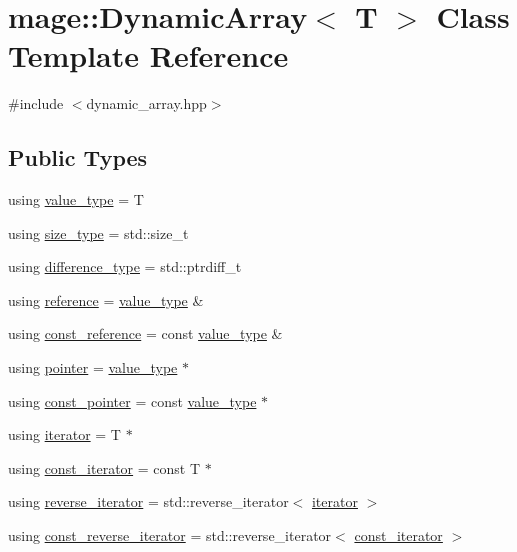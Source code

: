 \hypertarget{classmage_1_1_dynamic_array}{}\section{mage\+:\+:Dynamic\+Array$<$ T $>$ Class Template Reference}
\label{classmage_1_1_dynamic_array}


{\ttfamily \#include $<$dynamic\+\_\+array.\+hpp$>$}

\subsection*{Public Types}
\begin{DoxyCompactItemize}
\item 
using \mbox{\hyperlink{classmage_1_1_dynamic_array_a1f26711f844168c39991df0d5a340178}{value\+\_\+type}} = T
\item 
using \mbox{\hyperlink{classmage_1_1_dynamic_array_abae3236bcd8d1de414cbdf05219966b9}{size\+\_\+type}} = std\+::size\+\_\+t
\item 
using \mbox{\hyperlink{classmage_1_1_dynamic_array_a23347e93a3cf12c24608d95ed698ce20}{difference\+\_\+type}} = std\+::ptrdiff\+\_\+t
\item 
using \mbox{\hyperlink{classmage_1_1_dynamic_array_ac725ab843a578b8eb2e4499eca728149}{reference}} = \mbox{\hyperlink{classmage_1_1_dynamic_array_a1f26711f844168c39991df0d5a340178}{value\+\_\+type}} \&
\item 
using \mbox{\hyperlink{classmage_1_1_dynamic_array_ad2c044077223c0463e317649d4513dbc}{const\+\_\+reference}} = const \mbox{\hyperlink{classmage_1_1_dynamic_array_a1f26711f844168c39991df0d5a340178}{value\+\_\+type}} \&
\item 
using \mbox{\hyperlink{classmage_1_1_dynamic_array_a32797baab97829f4040b95383cdebf51}{pointer}} = \mbox{\hyperlink{classmage_1_1_dynamic_array_a1f26711f844168c39991df0d5a340178}{value\+\_\+type}} $\ast$
\item 
using \mbox{\hyperlink{classmage_1_1_dynamic_array_a875dce615abb0b5c6989167b3db40ef4}{const\+\_\+pointer}} = const \mbox{\hyperlink{classmage_1_1_dynamic_array_a1f26711f844168c39991df0d5a340178}{value\+\_\+type}} $\ast$
\item 
using \mbox{\hyperlink{classmage_1_1_dynamic_array_af49b03e8ab90f3f38f6fc735cef81baf}{iterator}} = T $\ast$
\item 
using \mbox{\hyperlink{classmage_1_1_dynamic_array_ad27aa1273eb102bbd596a13a00159001}{const\+\_\+iterator}} = const T $\ast$
\item 
using \mbox{\hyperlink{classmage_1_1_dynamic_array_a92d505734e8500e429d6b6e690b83dab}{reverse\+\_\+iterator}} = std\+::reverse\+\_\+iterator$<$ \mbox{\hyperlink{classmage_1_1_dynamic_array_af49b03e8ab90f3f38f6fc735cef81baf}{iterator}} $>$
\item 
using \mbox{\hyperlink{classmage_1_1_dynamic_array_afbcc530c2cd68cc3b0474a4b1a5c6a15}{const\+\_\+reverse\+\_\+iterator}} = std\+::reverse\+\_\+iterator$<$ \mbox{\hyperlink{classmage_1_1_dynamic_array_ad27aa1273eb102bbd596a13a00159001}{const\+\_\+iterator}} $>$
\end{DoxyCompactItemize}
